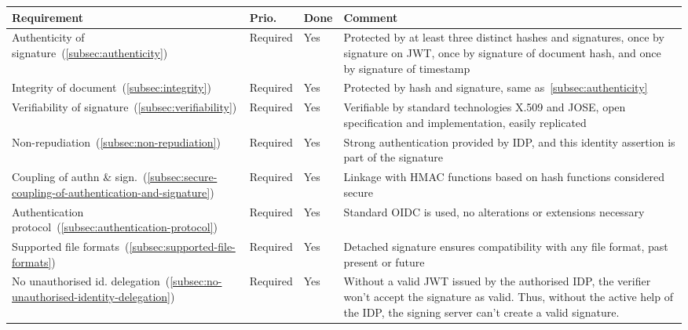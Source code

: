 \begin{center}
    \begin{longtable}{p{4.0cm}|p{1.35cm}|p{0.7cm}|p{9.0cm}}
        \textbf{Requirement} & \textbf{Prio.} & \textbf{Done} & \textbf{Comment}
        \\
        \hline
        Authenticity of signature~(\ref{subsec:authenticity})
        & Required
        & Yes
        & Protected by at least three distinct hashes and signatures,
        once by signature on \gls{JWT},
        once by signature of document hash,
        and once by signature of timestamp
        \\
        \hline
        Integrity of document~(\ref{subsec:integrity})
        & Required
        & Yes
        & Protected by hash and signature, same as~\ref{subsec:authenticity}
        \\
        \hline
        Verifiability of signature~(\ref{subsec:verifiability})
        & Required
        & Yes
        & Verifiable by standard technologies X.509 and \gls{JOSE},
        open specification and implementation,
        easily replicated
        \\
        \hline
        Non-repudiation~(\ref{subsec:non-repudiation})
        & Required
        & Yes
        & Strong authentication provided by \gls{IDP},
        and this identity assertion is part of the signature
        \\
        \hline
        Coupling of authn \& sign.~(\ref{subsec:secure-coupling-of-authentication-and-signature})
        & Required
        & Yes
        & Linkage with \gls{HMAC} functions based on hash functions considered secure
        \\
        \hline
        Authentication protocol~(\ref{subsec:authentication-protocol})
        & Required
        & Yes
        & Standard \gls{OIDC} is used, no alterations or extensions necessary
        \\
        \hline
        Supported file formats~(\ref{subsec:supported-file-formats})
        & Required
        & Yes
        & Detached signature ensures compatibility with any file format, past present or future
        \\
        No unauthorised id. delegation~(\ref{subsec:no-unauthorised-identity-delegation})
        & Required
        & Yes
        & Without a valid \gls{JWT} issued by the authorised \gls{IDP},
        the verifier won't accept the signature as valid.
        Thus, without the active help of the \gls{IDP},
        the signing server can't create a valid signature.

\end{longtable}
\end{center}
